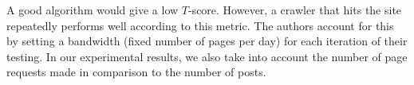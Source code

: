 A good algorithm would give a low $T$-score. However, a crawler that hits the 
site repeatedly performs well according to this metric. The authors account for 
this by setting a bandwidth (fixed number of pages per day) for each iteration 
of their testing. In our experimental results, we also take into account the 
number of page requests made in comparison to the number of posts. %

%


